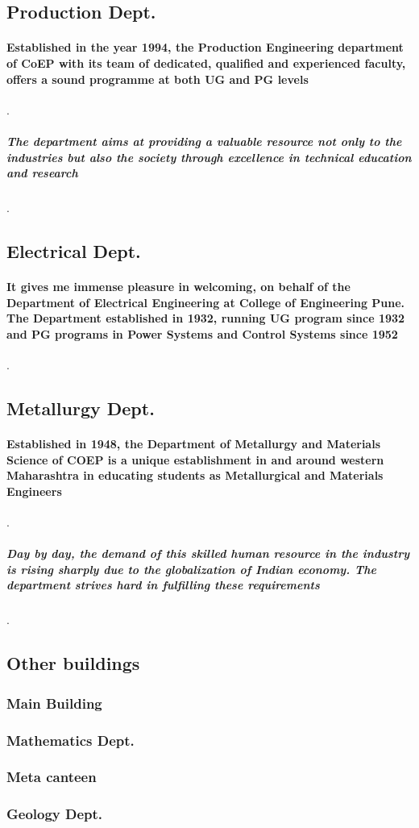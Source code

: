 \documentclass{article}
\begin{document}
	\subsection{Production Dept.}
	\paragraph{ Established in the year 1994, the Production Engineering department of CoEP with its team of dedicated, qualified and experienced faculty, offers a sound programme at both UG and PG levels}. \subparagraph{ The department aims at providing a valuable resource not only to the industries but also the society through excellence in technical education and research}.
	\newpage 
	\subsection{Electrical Dept.}
	\paragraph{ It gives me immense pleasure in welcoming, on behalf of the Department of Electrical Engineering at College of Engineering Pune. The Department established in 1932, running UG program since 1932 and PG programs in Power Systems and Control Systems since 1952}.
	\newpage
	\subsection{Metallurgy Dept.}
	\paragraph{ Established in 1948, the Department of Metallurgy and Materials Science of COEP is a unique establishment in and around western Maharashtra in educating students as Metallurgical and Materials Engineers}. \subparagraph{ Day by day, the demand of this skilled human resource in the industry is rising sharply due to the globalization of Indian economy. The department strives hard in fulfilling these requirements}.
	\newpage
	\subsection{Other buildings}
	\subsubsection{Main Building}
	\subsubsection{Mathematics Dept.}
\subsubsection{Meta canteen}
\subsubsection{Geology Dept.}

	
\end{document}
